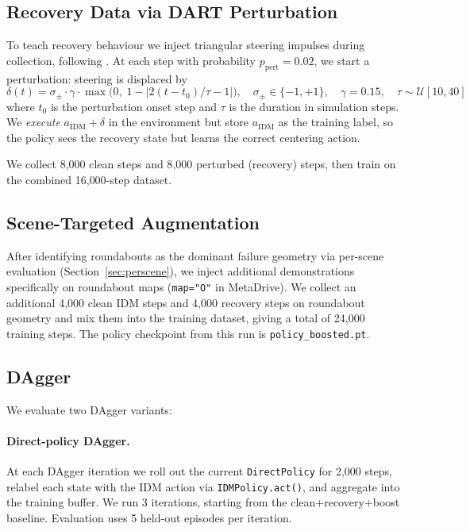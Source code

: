 \documentclass{article}
\begin{document}
\subsection{Recovery Data via DART Perturbation}

To teach recovery behaviour we inject triangular steering impulses during
collection, following \citet{laskey2017dart}. At each step with probability
$p_\text{pert} = 0.02$, we start a perturbation: steering is displaced by
\[
  \delta(t) = \sigma_\pm \cdot \gamma \cdot
    \max\!\bigl(0,\; 1 - |2(t - t_0)/\tau - 1|\bigr),
  \quad \sigma_\pm \in \{-1, +1\}, \quad \gamma = 0.15,
  \quad \tau \sim \mathcal{U}[10, 40]
\]
where $t_0$ is the perturbation onset step and $\tau$ is the duration in
simulation steps. We \emph{execute} $a_\text{IDM} + \delta$ in the
environment but store $a_\text{IDM}$ as the training label, so the policy
sees the recovery state but learns the correct centering action.

We collect 8{,}000 clean steps and 8{,}000 perturbed (recovery) steps, then
train on the combined 16{,}000-step dataset.

\subsection{Scene-Targeted Augmentation}
\label{sec:boost}

After identifying roundabouts as the dominant failure geometry via per-scene
evaluation (Section~\ref{sec:perscene}), we inject additional demonstrations
specifically on roundabout maps (\texttt{map="O"} in MetaDrive). We collect
an additional 4{,}000 clean IDM steps and 4{,}000 recovery steps on
roundabout geometry and mix them into the training dataset, giving a total
of 24{,}000 training steps. The policy checkpoint from this run is
\texttt{policy\_boosted.pt}.

\subsection{DAgger}

We evaluate two DAgger variants:

\paragraph{Direct-policy DAgger.}
At each DAgger iteration we roll out the current \texttt{DirectPolicy}
for 2{,}000 steps, relabel each state with the IDM action via
\texttt{IDMPolicy.act()}, and aggregate into the training buffer. We run
3 iterations, starting from the clean+recovery+boost baseline. Evaluation
uses 5 held-out episodes per iteration.
\end{document}
